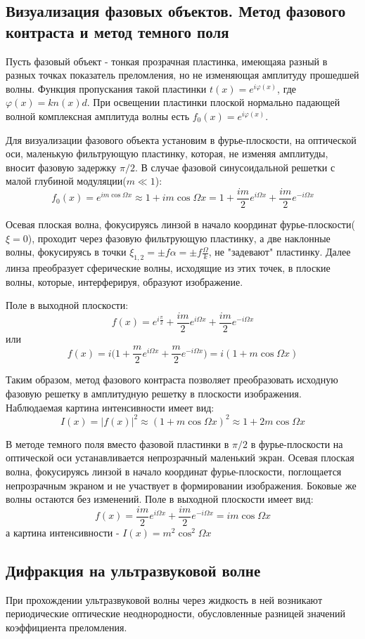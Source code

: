 \documentclass[a4paper,12pt]{article}
\begin{document}
\subsection{Визуализация фазовых объектов. Метод фазового контраста и метод темного поля}
Пусть фазовый объект - тонкая прозрачная пластинка, имеющаяа разный в разных точках показатель преломления, но не изменяющая амплитуду прошедшей волны. Функция пропускания такой пластинки $t(x)=e^{i\varphi(x)}$, где $\varphi(x)=kn(x)d$. При освещении пластинки плоской нормально падающей волной комплексная амплитуда волны есть $f_0(x)=e^{i\varphi(x)}$. 

Для визуализации фазового объекта установим в фурье-плоскости, на оптической оси, маленькую фильтрующую пластинку, которая, не изменяя амплитуды, вносит фазовую задержку $\pi/2$. В случае фазовой синусоидальной решетки с малой глубиной модуляции($m\ll 1$):
$$
f_0(x)=e^{im\cos{\Omega x}} \approx 1+im\cos{\Omega x} = 1 + \frac{im}{2}e^{i\Omega x} + \frac{im}{2}e^{-i\Omega x}
$$

Осевая плоская волна, фокусируясь линзой в начало координат фурье-плоскости($\xi=0$), проходит через фазовую фильтрующую пластинку, а две наклонные волны, фокусируясь в точки $\xi_{1,2}=\pm f\alpha =\pm f\frac{\Omega}{k}$, не "задевают" пластинку. Далее линза преобразует сферические волны, исходящие из этих точек, в плоские волны, которые, интерферируя, образуют изображение.

Поле в выходной плоскости:
$$
f(x)=e^{i\frac{\pi}{2}}+\frac{im}{2}e^{i\Omega x} + \frac{im}{2}e^{-i\Omega x}
$$
или
$$
f(x)=i\Big(1+\frac{m}{2}e^{i\Omega x} + \frac{m}{2}e^{-i\Omega x} \Big) = i(1 + m\cos{\Omega x})
$$

Таким образом, метод фазового контраста позволяет преобразовать исходную фазовую решетку в амплитудную решетку в плоскости изображения. Наблюдаемая картина интенсивности имеет вид:
$$
I(x)=|f(x)|^2 \approx (1+m\cos{\Omega x})^2 \approx 1 + 2m\cos{\Omega x}
$$

В методе темного поля вместо фазовой пластинки в $\pi/2$ в фурье-плоскости на оптической оси устанавливается непрозрачный маленький экран. Осевая плоская волна, фокусируясь линзой в начало  координат фурье-плоскости, поглощается непрозрачным экраном и не участвует в формировании изображения. Боковые же волны остаются без изменений. Поле в выходной плоскости имеет вид:
$$
f(x)=\frac{im}{2}e^{i\Omega x}+\frac{im}{2}e^{-i\Omega x}=im\cos{\Omega x}
$$
а картина интенсивности - $I(x)=m^2\cos^2{\Omega x}$

\subsection{Дифракция на ультразвуковой волне}
При прохождении ультразвуковой волны через жидкость в ней возникают периодические оптические неоднородности, обусловленные разницей значений коэффициента преломления.
\end{document}
